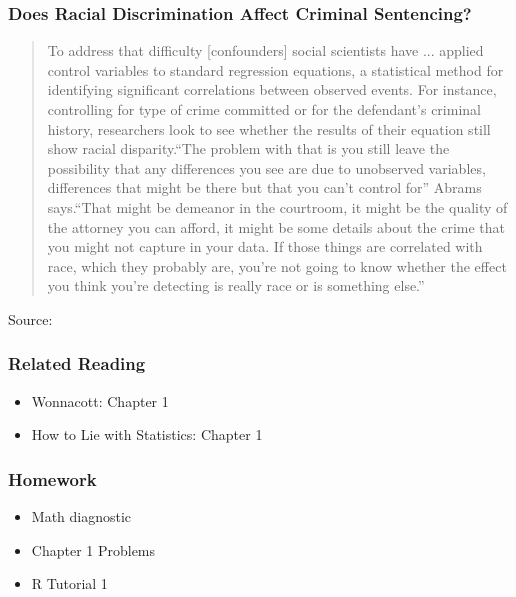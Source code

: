 \documentclass{beamer}
\begin{document}
\begin{frame}
\frametitle{Does Racial Discrimination  Affect Criminal Sentencing?}
	\footnotesize
	\begin{quote}
		To address that difficulty [confounders] social scientists have ... applied control variables to standard regression equations, a statistical method for identifying significant correlations between observed events. For instance, controlling for type of crime committed or for the defendant’s criminal history, researchers look to see whether the results of their equation still show racial disparity.\alert{``The problem with that is you still leave the possibility that any differences you see are due to unobserved variables, differences that might be there but that you can't control for''} Abrams says.``That might be demeanor in the courtroom, it might be the quality of the attorney you can afford, it might be some details about the crime that you might not capture in your data. If those things are correlated with race, which they probably are, you're not going to know whether the effect you think you're detecting is really race or is something else.''
	\end{quote}
	
	\tiny{Source: \href{https://www.law.upenn.edu/live/news/2170-new-study-by-professor-david-s-abrams-confirms}{}}
\end{frame}

\begin{frame}
\frametitle{Related Reading}
	\begin{itemize}
		\item Wonnacott: Chapter 1
		\item How to Lie with Statistics: Chapter 1
	\end{itemize}
\end{frame}

\begin{frame}
\frametitle{Homework}
	\begin{itemize}
		\item Math diagnostic
		\item Chapter 1 Problems
		\item R Tutorial 1
	\end{itemize}
\end{frame}

\end{document}
